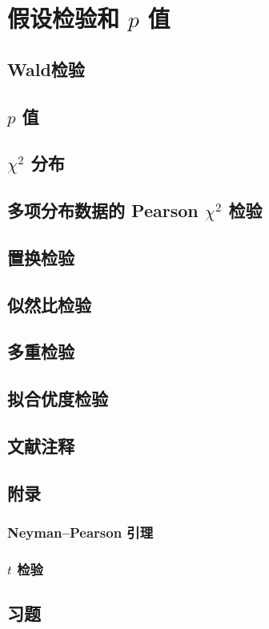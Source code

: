 \chapter{假设检验和 $p$ 值}

\section{Wald检验}

\pending

\section{$p$ 值}

\pending

\section{$\chi^2$ 分布}

\pending

\section{多项分布数据的 Pearson $\chi^2$ 检验}

\pending

\section{置换检验}

\pending

\section{似然比检验}

\pending

\section{多重检验}

\pending

\section{拟合优度检验}

\pending

\section{文献注释}

\pending

\section{附录}

\subsection{Neyman--Pearson 引理}

\pending


\subsection{$t$ 检验}

\pending

\section{习题}

\pending
